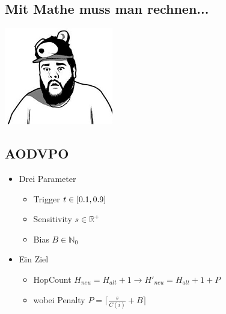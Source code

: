 \documentclass[11pt,landscape]{beamer}
\begin{document}
\subsection{Mit Mathe muss man rechnen...}

\begin{frame}{\insertsubsection}
  \begin{center}
\includegraphics[scale=0.75]{kid2}
  \end{center}
\end{frame}

\subsection{AODVPO}

\begin{frame}{\insertsubsection}
\begin{itemize}
\item Drei Parameter\newline
\begin{itemize}
\item Trigger $t \in \interval{0.1}{0.9}$ \newline
\item Sensitivity $s \in \mathbb{R^{+}}$\newline
\item Bias $B \in \mathbb{N}_0$\newline
\end{itemize}
\item Ein Ziel\newline
\begin{itemize}
\item HopCount $H_{neu} = H_{alt} + 1 \rightarrow H'_{neu} = H_{alt} + 1 + P$ \newline
\item wobei Penalty $P = \lceil\frac{s}{C(i)} + B\rceil$\newline
\end{itemize}
\end{itemize}
\end{frame}
\end{document}
